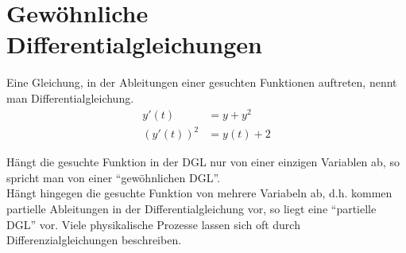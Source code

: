 \chapter{Gewöhnliche Differentialgleichungen}
Eine Gleichung, in der Ableitungen einer gesuchten Funktionen auftreten, nennt man Differentialgleichung.
\begin{align*}
y'(t)&=y+y^2\\
\left( y'(t)\right)^2&=y(t)+2
\end{align*}

Hängt die gesuchte Funktion in der DGL nur von einer einzigen Variablen ab, so spricht man von einer ``gewöhnlichen DGL''.\\

Hängt hingegen die gesuchte Funktion von mehrere Variabeln ab, d.h. kommen partielle Ableitungen in der Differentialgleichung vor, so liegt eine ``partielle DGL'' vor. Viele physikalische Prozesse lassen sich oft durch Differenzialgleichungen beschreiben.
